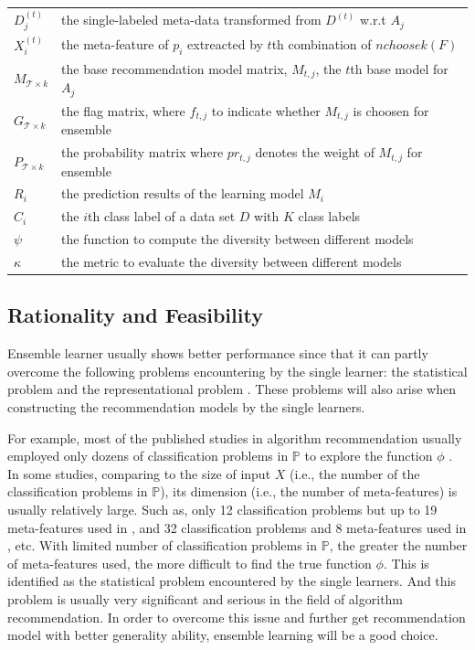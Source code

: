 \documentclass[acmsmall]{acmart}
\begin{document}
\begin{table}[!h]
\begin{tabular}{l|l}
		$D_{j}^{(t)}$ & the single-labeled meta-data transformed from $D^{(t)}$ w.r.t $A_{j}$ \\
		$X_{i}^{(t)}$ & the meta-feature of $p_{i}$ extreacted by $t$th combination of $nchoosek(F)$\\
		$M_{\mathcal{T}\times k}$ & the base recommendation model matrix, $M_{t,j}$, the $t$th base model for $A_j$\\
		$G_{\mathcal{T}\times k}$ & the flag matrix, where $f_{t,j}$ to indicate whether $M_{t,j}$ is choosen for ensemble\\
		$P_{\mathcal{T}\times k}$ & the probability matrix where $pr_{t,j}$ denotes the weight of $M_{t,j}$ for ensemble\\
		$R_{i}$ & the prediction results of the learning model $M_{i}$\\
		$C_{i}$ & the $i$th class label of a data set $D$ with $K$ class labels\\
		$\psi$ & the function to compute the diversity between different models\\
		$\kappa$ &  the metric to evaluate the diversity between different models\\
		\hline
	\end{tabular}
\end{table}


\subsection{Rationality and Feasibility}\label{subsec:rationality}

Ensemble learner usually shows better performance since that it can
partly overcome the following problems encountering by the single
learner: the statistical problem and the representational problem
\cite{dietterichl2002ensemble}. These problems will also arise when
constructing the recommendation models by the single learners.

For example, most of the published studies in algorithm
recommendation usually employed only dozens of classification
problems in $\mathbb{P}$ to explore the function $\phi$
\cite{brazdil2003ranking,king1995statlog,song2012automatic,ali2006learning,prudencio2011selecting,peng2002improved,kalousis2004data,kalousis2002algorithm,brodley1993addressing,Pfahringer00meta}.
In some studies, comparing to the size of input $X$ (i.e., the
number of the classification problems in $\mathbb{P}$), its
dimension (i.e., the number of meta-features) is usually relatively
large. Such as, only 12 classification problems but up to 19
meta-features used in \cite{king1995statlog}, and 32 classification
problems and 8 meta-features used in \cite{prudencio2011selecting},
etc. With limited number of classification problems in $\mathbb{P}$,
the greater the number of meta-features used, the more difficult to
find the true function $\phi$. This is identified as the statistical
problem encountered by the single learners. And this problem is
usually very significant and serious in the field of algorithm
recommendation. In order to overcome this issue and further get
recommendation model with better generality ability, ensemble
learning will be a good choice.
\end{document}
